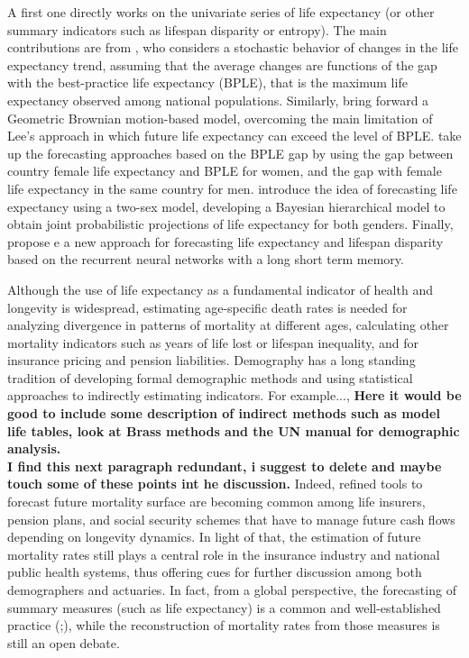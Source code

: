\documentclass[a4,11pt]{article}
\begin{document}
 A first one directly works on the univariate series of life expectancy (or other summary indicators such as lifespan disparity or entropy). The main contributions are from \cite{Lee2006}, who considers a stochastic behavior of changes in the life expectancy trend, assuming that the average changes are functions of the gap with the best-practice life expectancy (BPLE), that is the maximum life expectancy observed among national populations. Similarly, \cite{TorriVaupel12} bring forward a Geometric Brownian motion-based model, overcoming the main limitation of Lee's approach in which future life expectancy can exceed the level of BPLE.
\cite{Pascariu18} take up the forecasting approaches based on the BPLE gap by using the gap between country female life expectancy and BPLE for women, and the gap with female life expectancy in the same country for men. \cite{Raftery13} introduce the idea of forecasting life expectancy using a two-sex model, developing a Bayesian hierarchical model to obtain joint probabilistic projections of life expectancy for both genders. 
Finally, \cite{Nigri19} propose e a new approach for forecasting life expectancy and lifespan disparity based on the recurrent neural networks with a long short
term memory.

Although the use of life expectancy as a fundamental indicator of health and longevity is widespread, estimating age-specific death rates is needed for analyzing divergence in patterns of mortality at different ages, calculating other mortality indicators such as years of life lost or lifespan inequality, and for insurance pricing and pension liabilities. Demography has a long standing tradition of developing formal demographic methods and using statistical approaches to indirectly estimating indicators. For example..., \textbf{Here it would be good to include some description of indirect methods such as model life tables, look at Brass methods and the UN manual for demographic analysis.}\\

\textbf{I find this next paragraph redundant, i suggest to delete and maybe touch some of these points int he discussion.} Indeed, refined tools to forecast future mortality surface are becoming common among life insurers, pension plans, and social security schemes that have to manage future cash flows depending on longevity dynamics. In light of that, the estimation of future mortality rates still plays a central role in the insurance industry and national public health systems, thus offering cues for further discussion among both demographers and actuaries. In fact, from a global perspective, the forecasting of summary measures (such as life expectancy) is a common and well-established practice (\cite{Miller86};\cite{Lee93}), while the reconstruction of mortality rates from those measures is still an open debate.\\
\end{document}
